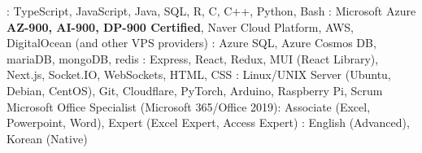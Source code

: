

\begin{cvparagraph}
  \raggedright
  : TypeScript, JavaScript, Java, SQL, R, C, C++, Python, Bash
  \linebreak
  : Microsoft Azure \textbf{AZ-900, AI-900, DP-900 Certified}, Naver Cloud Platform, AWS, DigitalOcean (and other VPS providers)
  \linebreak
  : Azure SQL, Azure Cosmos DB, mariaDB, mongoDB, redis
  \linebreak
  : Express, React, Redux, MUI (React Library), Next.js, Socket.IO, WebSockets, HTML, CSS
  \linebreak
  : Linux/UNIX Server (Ubuntu, Debian, CentOS), Git, Cloudflare, PyTorch, Arduino, Raspberry Pi, Scrum \\
  Microsoft Office Specialist (Microsoft 365/Office 2019): Associate (Excel, Powerpoint, Word), Expert (Excel Expert, Access Expert)
  \linebreak
  : English (Advanced), Korean (Native)
\end{cvparagraph}
